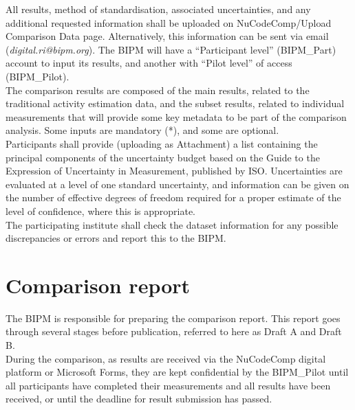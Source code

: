 \documentclass[12pt]{iopart}
\begin{document}
All results, method of standardisation, associated uncertainties, and any additional requested information shall be uploaded on NuCodeComp/Upload Comparison Data page. Alternatively, this information can be sent via email (\emph{digital.ri@bipm.org}). The BIPM will have a “Participant level” (BIPM\_Part) account to input its results, and another with “Pilot level” of access (BIPM\_Pilot). \\

The comparison results are composed of the main results, related to the traditional activity estimation data, and the subset results, related to individual measurements that will provide some key metadata to be part of the comparison analysis. Some inputs are mandatory (*), and some are optional. \\

Participants shall provide (uploading as Attachment) a list containing the principal components of the uncertainty budget based on the Guide to the Expression of Uncertainty in Measurement, published by ISO. Uncertainties are evaluated at a level of one standard uncertainty, and information can be given on the number of effective degrees of freedom required for a proper estimate of the level of confidence, where this is appropriate. \\


The participating institute shall check the dataset information for any possible discrepancies or errors and report this to the BIPM. \\

\section{Comparison report}

The BIPM is responsible for preparing the comparison report. This report goes through several stages before publication, referred to here as Draft A and Draft B. \\

During the comparison, as results are received via the NuCodeComp digital platform or Microsoft Forms, they are kept confidential by the BIPM\_Pilot until all participants have completed their measurements and all results have been received, or until the deadline for result submission has passed. \\
\end{document}
